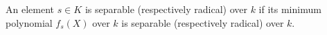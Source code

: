 An element $s \in K$ is separable (respectively radical) over $k$ if its minimum polynomial $f_s(X)$ over $k$ is separable (respectively radical) over $k$.
